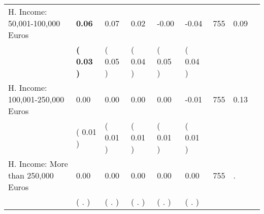\begin{tabular}{L{6.2cm} C{1.8cm} C{1.8cm} C{1.8cm} C{1.8cm} C{1.8cm} C{1.8cm} C{0.3cm} C{0.3cm}}
H. Income: 50,001-100,000 Euros & \textbf{     0.06} &      0.07 &      0.02 &     -0.00 &     -0.04  & 755 &       0.09 \\ 
 & \textbf{(     0.03 )} & (     0.05 ) & (     0.04 ) & (     0.05 ) & (     0.04 )  & \\
H. Income: 100,001-250,000 Euros &      0.00 &      0.00 &      0.00 &      0.00 &     -0.01  & 755 &       0.13 \\ 
 & (     0.01 ) & (     0.01 ) & (     0.01 ) & (     0.01 ) & (     0.01 )  & \\
H. Income: More than 250,000 Euros &      0.00 &      0.00 &      0.00 &      0.00 &      0.00  & 755 &          . \\ 
 & (        . ) & (        . ) & (        . ) & (        . ) & (        . )  & \\
\bottomrule
\end{tabular}
